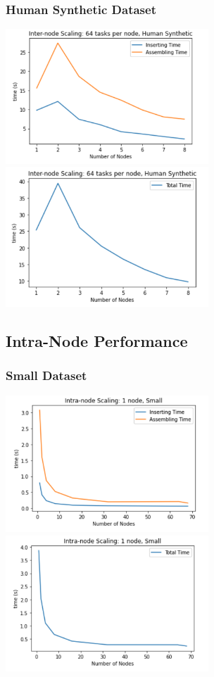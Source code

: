 \documentclass{article}
\begin{document}
\subsubsection{Human Synthetic Dataset}
\centerline{\includegraphics[width=3in]{figures/inter-human-prof.png}\includegraphics[width=3in]{figures/inter-human.png}}
\subsection{Intra-Node Performance}
\subsubsection{Small Dataset}
\centerline{\includegraphics[width=3in]{figures/intra-small-prof.png}\includegraphics[width=3in]{figures/intra-small.png}}
\end{document}
